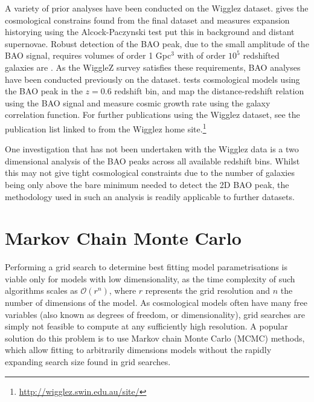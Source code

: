 \documentclass[titlesmallcaps, examinerscopy, copyrightpage]{uqthesis}
\newcommand{\red}{\color{red}}
\begin{document}
A variety of prior analyses have been conducted on the Wigglez dataset.  \citet{Parkinson2012} gives the cosmological constrains found from the final dataset and \citet{BlakeGlazebrook2011} measures expansion historying using the Alcock-Paczynski test {\red put this in background} and distant supernovae. Robust detection of the BAO peak, due to the small amplitude of the BAO signal, requires volumes of order 1 Gpc$^3$ with of order $10^5$ redshifted galaxies are \citep{Tegmark1997,BlakeGlazebrook2003,BlakeParkinson2006}. As the WiggleZ survey satisfies these requirements, BAO analyses have been conducted previously on the dataset. \citet{BlakeDavis2011} tests cosmological models using the BAO peak in the $z=0.6$ redshift bin, \citet{BlakeKazin2011} and \citet{KazinKoda2014} map the distance-redshift relation using the BAO signal and \citet{ContrerasBlake2013} measure cosmic growth rate using the galaxy correlation function. For further publications using the Wigglez dataset, see the publication list linked to from the Wigglez home site.\footnote{\url{http://wigglez.swin.edu.au/site/}}



One investigation that has not been undertaken with the Wigglez data is a two dimensional analysis of the BAO peaks across all available redshift bins. Whilst this may not give tight cosmological constraints due to the number of galaxies being only above the bare minimum needed to detect the 2D BAO peak, the methodology used in such an analysis is readily applicable to further datasets.



\section{Markov Chain Monte Carlo}

Performing a grid search to determine best fitting model parametrisations is viable only for models with low dimensionality, as the time complexity of such algorithms scales as $\mathcal{O}(r^n)$, where $r$ represents the grid resolution and $n$ the number of dimensions of the model. As cosmological models often have many free variables (also known as degrees of freedom, or dimensionality), grid searches are simply not feasible to compute at any sufficiently high resolution. A popular solution do this problem is to use Markov chain Monte Carlo (MCMC) methods, which allow fitting to arbitrarily dimensions models without the rapidly expanding search size found in grid searches.
\end{document}
